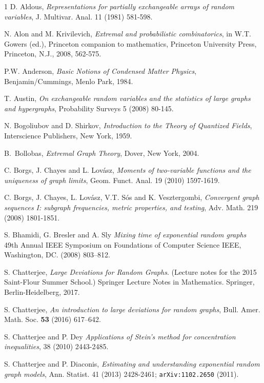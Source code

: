 \documentclass[12pt]{amsart}
\newcommand{\tet}{\textit}
\begin{document}
{\begin{thebibliography}{1}
 {\sc  D. Aldous}, 
\textit{Representations for partially exchangeable arrays of random variables}, J. Multivar. Anal. 11 (1981) 581-598.


 {\sc N. Alon and M. Krivilevich}, \textit{Extremal and probabilistic combinatorics}, 
in W.T. Gowers (ed.), Princeton companion to mathematics, Princeton University Press, Princeton, N.J., 2008, 562-575.


 {\sc P.W. Anderson}, \textit{Basic Notions of Condensed Matter
Physics}, Benjamin/Cummings, Menlo Park, 1984.

 {\sc T. Austin}, \textit{On exchangeable random variables and the statistics of large graphs and
hypergraphs}, Probability Surveys 5 (2008) 80-145.

 {\sc N. Bogoliubov and D. Shirkov}, \tet{Introduction to the Theory of Quantized Fields}, Interscience Publishers, New York, 1959.


{\sc B.~Bollobas}, \textit{Extremal Graph Theory}, Dover, New York, 2004.


{\sc C. Borgs, J. Chayes and L. Lov\'{a}sz}, \textit{Moments of
  two-variable functions and the uniqueness of graph limits},
  Geom. Funct. Anal. 19 (2010) 1597-1619.

{\sc C. Borgs, J. Chayes, L. Lov\'{a}sz, V.T. S\'os
    and K. Vesztergombi}, \textit{Convergent graph sequences I: subgraph
  frequencies, metric properties, and testing}, { Adv. Math.} { 219}
  (2008) 1801-1851.

 {\sc S. Bhamidi, G. Bresler and A. Sly} \textit{Mixing time of exponential random graphs}
{49th Annual IEEE Symposium on Foundations of Computer Science}
IEEE, Washington, DC.
(2008) 803–812.


 {\sc S. Chatterjee},
 \textit{Large Deviations for Random Graphs}. (Lecture notes for the 2015
 Saint-Flour Summer School.) Springer Lecture Notes in
 Mathematics. Springer, Berlin-Heidelberg, 2017.

{\sc S. Chatterjee},
\textit{An introduction to large deviations for random graphs},
Bull. Amer. Math. Soc. {\bf 53} (2016) 617--642.

{\sc S. Chatterjee and P. Dey
\textit{Applications of Stein's method for concentration inequalities},
{38} (2010) 2443-2485.}

{\sc S. Chatterjee and P. Diaconis}, \textit{Estimating and understanding
exponential random graph models}, Ann. Statist. 41 (2013) 2428-2461;
\texttt{arXiv:1102.2650} (2011).


\end{thebibliography}}
\end{document}
